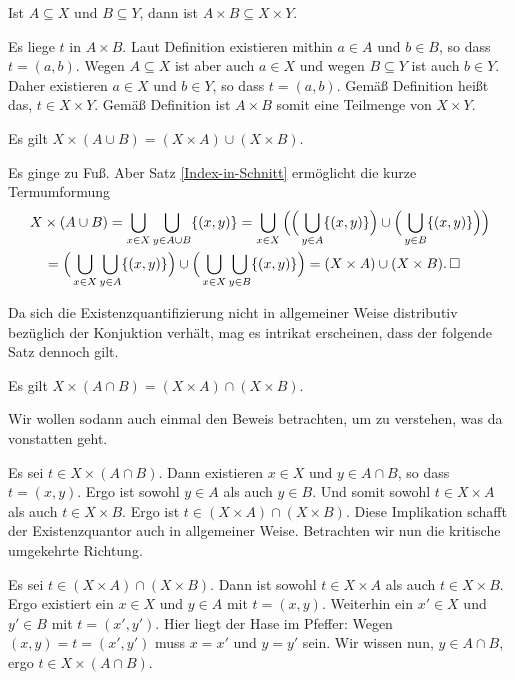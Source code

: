 \begin{Satz}
Ist $A\subseteq X$ und $B\subseteq Y$, dann ist
$A\times B\subseteq X\times Y$.
\end{Satz}
\begin{Beweis}
Es liege $t$ in $A\times B$. Laut Definition existieren mithin
$a\in A$ und $b\in B$, so dass $t=(a,b)$. Wegen $A\subseteq X$ ist aber
auch $a\in X$ und wegen $B\subseteq Y$ ist auch $b\in Y$. Daher existieren
$a\in X$ und $b\in Y$, so dass $t=(a,b)$. Gemäß Definition heißt das,
$t\in X\times Y$. Gemäß Definition ist $A\times B$ somit eine Teilmenge
von $X\times Y$.\;\qedsymbol
\end{Beweis}

\begin{Satz}
Es gilt $X\times (A\cup B) = (X\times A)\cup (X\times B)$.
\end{Satz}
\begin{Beweis}
Es ginge zu Fuß. Aber Satz \ref{Index-in-Schnitt} ermöglicht die
kurze Termumformung%
\begin{align*}
& X\times (A\cup B) = \bigcup_{x\in X}\bigcup_{y\in A\cup B} \{(x,y)\}
= \bigcup_{x\in X}\Big(\Big(\bigcup_{y\in A}\{(x,y)\}\Big)\cup \Big(\bigcup_{y\in B}\{(x,y)\}\Big)\Big)\\
&\quad = \Big(\bigcup_{x\in X}\bigcup_{y\in A}\{(x,y)\}\Big)\cup\Big(\bigcup_{x\in X}\bigcup_{y\in B}\{(x,y)\}\Big)
= (X\times A)\cup (X\times B).\,\Box
\end{align*}
\end{Beweis}

\noindent
Da sich die Existenzquantifizierung nicht in allgemeiner Weise
distributiv bezüglich der Konjuktion verhält, mag es intrikat erscheinen,
dass der folgende Satz dennoch gilt.
\begin{Satz}
Es gilt $X\times (A\cap B) = (X\times A)\cap (X\times B)$.
\end{Satz}
\begin{Beweis}
Wir wollen sodann auch einmal den Beweis betrachten, um zu verstehen,
was da vonstatten geht.

Es sei $t\in X\times (A\cap B)$. Dann existieren $x\in X$ und
$y\in A\cap B$, so dass $t=(x,y)$. Ergo ist sowohl $y\in A$ als
auch $y\in B$. Und somit sowohl $t\in X\times A$ als auch
$t\in X\times B$. Ergo ist $t\in (X\times A)\cap (X\times B)$.
Diese Implikation schafft der Existenzquantor auch in allgemeiner
Weise. Betrachten wir nun die kritische umgekehrte Richtung.

Es sei $t\in (X\times A)\cap (X\times B)$. Dann ist sowohl
$t\in X\times A$ als auch $t\in X\times B$. Ergo existiert ein
$x\in X$ und $y\in A$ mit $t=(x,y)$. Weiterhin ein $x'\in X$ und
$y'\in B$ mit $t=(x',y')$. Hier liegt der Hase im Pfeffer: Wegen
$(x,y)=t=(x',y')$ muss $x=x'$ und $y=y'$ sein. Wir wissen nun,
$y\in A\cap B$, ergo $t\in X\times (A\cap B)$.\,\qedsymbol
\end{Beweis}

